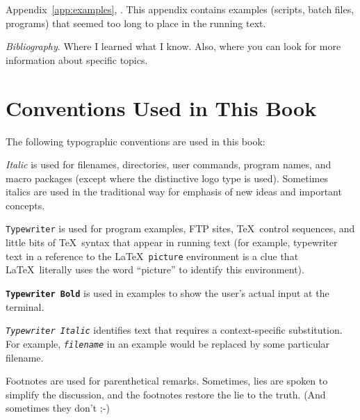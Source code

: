 Appendix~\ref{app:examples}, \textit{}.  This appendix
contains examples (scripts, batch files, programs) that seemed too long to
place in the running text.

{\it Bibliography}.  Where I learned what I know.  Also, where you can look
for more information about specific topics.

\section{Conventions Used in This Book}

The following typographic conventions are used in this book:

\begin{conventions}

\item [{\it Italic}] is used for filenames, directories, user commands, program names, and macro packages (except where the distinctive logo type is used).  Sometimes italics
      are used in the traditional way for emphasis of new ideas and important
      concepts.

\item [{\tt Typewriter}] is used for program examples, FTP sites, \TeX\
      control sequences, and 
      little bits of \TeX\ syntax that appear in running text (for example,
      typewriter text in a reference to the \LaTeX\ \verb|picture|
      environment is a clue that \LaTeX\ literally uses the word ``picture''
      to identify this environment).

\item [{\tt\bf Typewriter Bold}] is used in examples to show the user's actual
      input at the terminal.

\newpage
\item [{\tt\it Typewriter Italic}] identifies text that requires a
      context-specific substitution.  For example, \textit{\texttt{filename}}
      in an example would be replaced by some particular filename.

\item [Footnotes] are used for parenthetical remarks.  Sometimes, lies are
      spoken to simplify the discussion, and the footnotes restore the lie to
      the truth. (And sometimes they don't ;-)

% 
%

\end{conventions}

